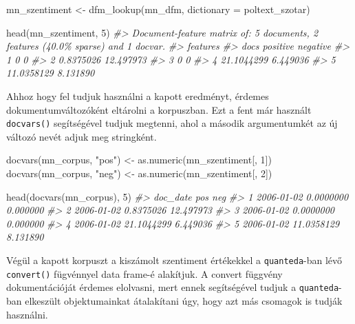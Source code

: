 \documentclass[
]{book}
\newenvironment{Shaded}{\begin{snugshade}}{\end{snugshade}}
\newcommand{\AttributeTok}[1]{\textcolor[rgb]{0.77,0.63,0.00}{#1}}
\newcommand{\CommentTok}[1]{\textcolor[rgb]{0.56,0.35,0.01}{\textit{#1}}}
\newcommand{\DecValTok}[1]{\textcolor[rgb]{0.00,0.00,0.81}{#1}}
\newcommand{\FunctionTok}[1]{\textcolor[rgb]{0.00,0.00,0.00}{#1}}
\newcommand{\NormalTok}[1]{#1}
\newcommand{\OtherTok}[1]{\textcolor[rgb]{0.56,0.35,0.01}{#1}}
\newcommand{\StringTok}[1]{\textcolor[rgb]{0.31,0.60,0.02}{#1}}
\begin{document}
\begin{Shaded}
\begin{Highlighting}[]
\NormalTok{mn\_szentiment }\OtherTok{\textless{}{-}} \FunctionTok{dfm\_lookup}\NormalTok{(mn\_dfm, }\AttributeTok{dictionary =}\NormalTok{ poltext\_szotar)}

\FunctionTok{head}\NormalTok{(mn\_szentiment, }\DecValTok{5}\NormalTok{)}
\CommentTok{\#\textgreater{} Document{-}feature matrix of: 5 documents, 2 features (40.0\% sparse) and 1 docvar.}
\CommentTok{\#\textgreater{}     features}
\CommentTok{\#\textgreater{} docs   positive  negative}
\CommentTok{\#\textgreater{}    1  0          0       }
\CommentTok{\#\textgreater{}    2  0.8375026 12.497973}
\CommentTok{\#\textgreater{}    3  0          0       }
\CommentTok{\#\textgreater{}    4 21.1044299  6.449036}
\CommentTok{\#\textgreater{}    5 11.0358129  8.131890}
\end{Highlighting}
\end{Shaded}

Ahhoz hogy fel tudjuk használni a kapott eredményt, érdemes
dokumentumváltozóként eltárolni a korpuszban. Ezt a fent már használt
\texttt{docvars()} segítségével tudjuk megtenni, ahol a második
argumentumkét az új változó nevét adjuk meg stringként.

\begin{Shaded}
\begin{Highlighting}[]

\FunctionTok{docvars}\NormalTok{(mn\_corpus, }\StringTok{"pos"}\NormalTok{) }\OtherTok{\textless{}{-}} \FunctionTok{as.numeric}\NormalTok{(mn\_szentiment[, }\DecValTok{1}\NormalTok{])}
\FunctionTok{docvars}\NormalTok{(mn\_corpus, }\StringTok{"neg"}\NormalTok{) }\OtherTok{\textless{}{-}} \FunctionTok{as.numeric}\NormalTok{(mn\_szentiment[, }\DecValTok{2}\NormalTok{])}

\FunctionTok{head}\NormalTok{(}\FunctionTok{docvars}\NormalTok{(mn\_corpus), }\DecValTok{5}\NormalTok{)}
\CommentTok{\#\textgreater{}     doc\_date        pos       neg}
\CommentTok{\#\textgreater{} 1 2006{-}01{-}02  0.0000000  0.000000}
\CommentTok{\#\textgreater{} 2 2006{-}01{-}02  0.8375026 12.497973}
\CommentTok{\#\textgreater{} 3 2006{-}01{-}02  0.0000000  0.000000}
\CommentTok{\#\textgreater{} 4 2006{-}01{-}02 21.1044299  6.449036}
\CommentTok{\#\textgreater{} 5 2006{-}01{-}02 11.0358129  8.131890}
\end{Highlighting}
\end{Shaded}

Végül a kapott korpuszt a kiszámolt szentiment értékekkel a
\texttt{quanteda}-ban lévő \texttt{convert()} fügvénnyel data frame-é
alakítjuk. A convert függvény dokumentációját érdemes elolvasni, mert
ennek segítségével tudjuk a \texttt{quanteda}-ban elkeszült
objektumainkat átalakítani úgy, hogy azt más csomagok is tudják
használni.
\end{document}
